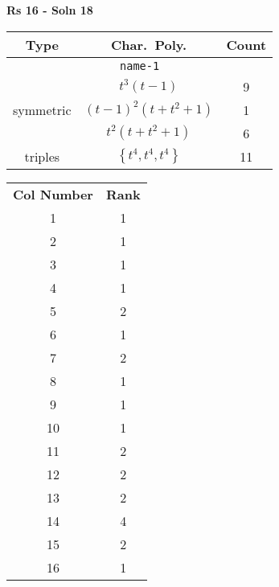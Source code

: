 \documentclass{article}
\begin{document}
    \textbf{Rs 16 - Soln 18}
    \begin{table}
    \begin{tabular}{|c|c|c|}
    \hline
    \textbf{Type} & \textbf{Char.~Poly.} & \textbf{Count} \\
    \hline \multicolumn{3}{|c|}{\texttt{name-1}} \\ \hline
    \multirow{3}{*}{symmetric}
    & $t^3(t - 1)$ & 9 \\
    & $(t - 1)^2(t + t^2 + 1)$ & 1 \\
    & $t^2(t + t^2 + 1)$ & 6 \\
    \hline
    \multirow{1}{*}{triples}
    & $\left\{t^4,t^4,t^4\right\}$ & 11 \\
    \hline
    \end{tabular}
    \end{table}
    \begin{table}
    \begin{tabular}{|c|c|}
    \hline
    \textbf{Col Number} & \textbf{Rank}\\
    1 & 1 \\ 
    2 & 1 \\ 
    3 & 1 \\ 
    4 & 1 \\ 
    5 & 2 \\ 
    6 & 1 \\ 
    7 & 2 \\ 
    8 & 1 \\ 
    9 & 1 \\ 
    10 & 1 \\ 
    11 & 2 \\ 
    12 & 2 \\ 
    13 & 2 \\ 
    14 & 4 \\ 
    15 & 2 \\ 
    16 & 1 \\ 
    \hline
    \end{tabular}
    \end{table}
    \newpage
\end{document}
